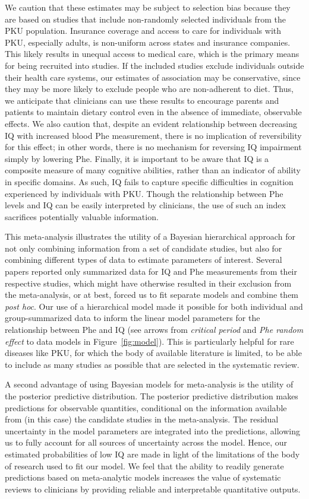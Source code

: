\documentclass{svjour3}                     %
\begin{document}
We caution that these estimates may be subject to selection bias because they are based on studies that include non-randomly selected individuals from the PKU population. Insurance coverage and access to care for individuals with PKU, especially adults, is non-uniform across states and insurance companies. This likely results in unequal access to medical care, which is the primary means for being recruited into studies. If the included studies exclude individuals outside their health care systems, our estimates of association may be conservative, since they may be more likely to exclude people who are non-adherent to diet. Thus, we anticipate that clinicians can use these results to encourage parents and patients to maintain dietary control even in the absence of immediate, observable effects. We also caution that, despite an evident relationship between decreasing IQ with increased blood Phe measurement, there is no implication of reversibility for this effect; in other words, there is no mechanism for reversing IQ impairment simply by lowering Phe. Finally, it is important to be aware that IQ is a composite measure of many cognitive abilities, rather than an indicator of ability in specific domains. As such, IQ fails to capture specific difficulties in cognition experienced by individuals with PKU. Though the relationship between Phe levels and IQ can be easily interpreted by clinicians, the use of such an index sacrifices potentially valuable information.

This meta-analysis illustrates the utility of a Bayesian hierarchical approach for not only combining information from a set of candidate studies, but also for combining different types of data to estimate parameters of interest. Several papers reported only summarized data for IQ and Phe measurements from their respective studies, which might have otherwise resulted in their exclusion from the meta-analysis, or at best, forced us to fit separate models and combine them \emph{post hoc}. Our use of a hierarchical model made it possible for both individual and group-summarized data to inform the linear model parameters for the relationship between Phe and IQ (see arrows from \emph{critical period} and \emph{Phe random effect} to data models in Figure~\ref{fig:model}). This is particularly helpful for rare diseases like PKU, for which the body of available literature is limited, to be able to include as many studies as possible that are selected in the systematic review.

A second advantage of using Bayesian models for meta-analysis is the utility of the posterior predictive distribution. The posterior predictive distribution makes predictions for observable quantities, conditional on the information available from (in this case) the candidate studies in the meta-analysis. The residual uncertainty in the model parameters are integrated into the predictions, allowing us to fully account for all sources of uncertainty across the model. Hence, our estimated probabilities of low IQ are made in light of the limitations of the body of research used to fit our model. We feel that the ability to readily generate predictions based on meta-analytic models increases the value of systematic reviews to clinicians by providing reliable and interpretable quantitative outputs.
\end{document}
